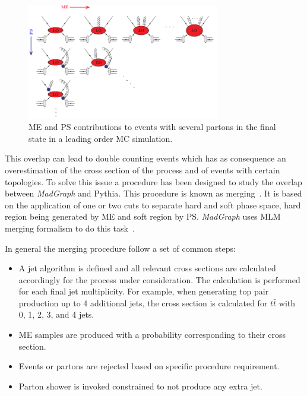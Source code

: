 \begin{figure}[!Hhtbp]
  \begin{center}
    \includegraphics[width=0.75\textwidth]{figs/PSMEInterface.png}
    \caption{ME and PS contributions to events with several partons in the final state in a leading order MC simulation.}
    \label{fig:PSME}
  \end{center}
\end{figure}

This overlap can lead to double counting events which has as consequence an overestimation of the cross section of the process and of events with certain topologies. To solve this issue a procedure has been designed to study the overlap between \textit{MadGraph} and Pythia. This procedure is known as merging~\cite{Alwall:2007fs, Alwall:2008qv, Lavesson:2007uu}. It is based on the application of one or two cuts to separate hard and soft phase space, hard region being generated by ME and soft region by PS. \textit{MadGraph} uses MLM merging formalism to do this task~\cite{Mangano:2001xp, Mangano:2006rw}. 

In general the merging procedure follow a set of common steps:
\begin{itemize}
\item A jet algorithm is defined and all relevant cross sections are calculated accordingly for the process under consideration. The calculation is performed for each final jet multiplicity. For example, when generating top pair production up to 4 additional jets, the cross section is calculated for $t\bar{t}$ with 0, 1, 2, 3, and 4 jets. 
\item ME samples are produced with a probability corresponding to their cross section.
\item Events or partons are rejected based on specific procedure requirement.
\item Parton shower is invoked constrained to not produce any extra jet.
\end{itemize}

